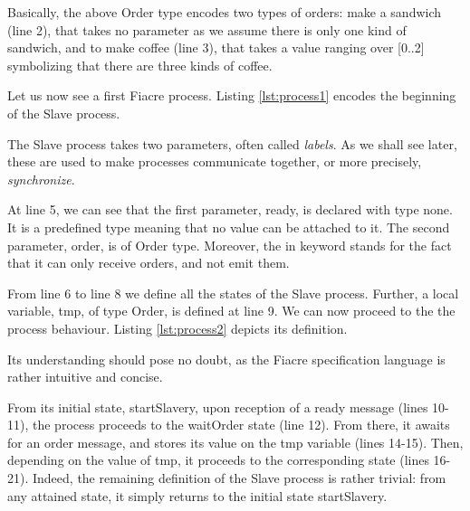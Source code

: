 			
			

	\noindent Basically, the above \textsf{Order} type encodes two types of orders:
	make a sandwich (line 2), that takes no parameter as we assume there is only one kind
	of sandwich, and to make coffee (line 3), that takes a value ranging over [0..2]
	symbolizing that there are three kinds of coffee. 
	
	Let us now see a first Fiacre process. Listing \ref{lst:process1} encodes
	the beginning of the \textsf{Slave} process.
	
		

	\noindent The \textsf{Slave} process takes two parameters, often called \textit{labels}.
	As we shall see later, these are used to make processes communicate together,
	or more precisely, \textit{synchronize}.
	
	At line 5, we can see that the first parameter, \textsf{ready}, is declared with type \textsf{none}. 
	It is a predefined
	type meaning that no value can be attached to it. The second parameter, \textsf{order},
	is  of \textsf{Order} type.	 Moreover, the \textsf{in} keyword stands for the fact that it can
	only receive orders, and not emit them.

	From line 6 to line 8 we define all the states of the \textsf{Slave} process. Further, a local variable,
	\textsf{tmp}, of type \textsf{Order}, is defined at line 9. We can now proceed to the
	 the process behaviour. Listing \ref{lst:process2} depicts its definition.

		

	\noindent Its understanding should pose no doubt, as the Fiacre specification language
	is rather intuitive and concise. 
	
	From its initial state, \textsf{startSlavery}, upon reception of a
	\textsf{ready} message (lines 10-11), the process proceeds
    to the \textsf{waitOrder} state (line 12). From there, it awaits
    for an \textsf{order} message, and stores its value on the \textsf{tmp}
    variable (lines 14-15). Then, depending on the value of \textsf{tmp}, it
    proceeds to the corresponding state (lines 16-21). Indeed, the remaining
    definition of the \textsf{Slave} process is rather trivial: from any attained
    state, it simply returns to the initial state \textsf{startSlavery}.
    
